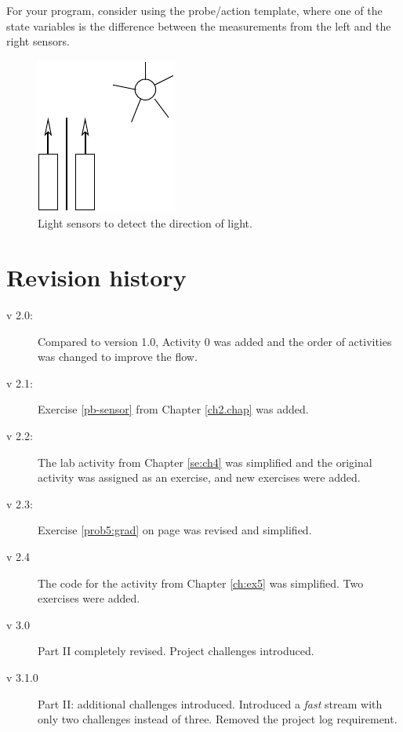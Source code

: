 \documentclass[12pt]{book}
\begin{document}
For your program, consider using the probe/action template, where one
of the state variables is the difference between the measurements from
the left and the right sensors.

\begin{figure}[tb]
  \begin{center}
	\includegraphics[width=.2\textwidth]{figs/2eyes}
  \end{center}
\caption{Light sensors to detect the direction of
  light.}	\label{fig:2eyes} 
\end{figure}



\appendix
\chapter{Revision history}

\begin{description}
\item[v 2.0:] Compared to version 1.0, Activity 0 was added and the
  order of activities was changed to improve the flow.
\item[v 2.1:] Exercise \ref{pb-sensor} from Chapter \ref{ch2.chap} was
  added.
\item[v 2.2:] The lab activity from Chapter \ref{se:ch4} was
  simplified and the original activity was assigned as an exercise,
  and new exercises were added.
\item[v 2.3:] Exercise \ref{prob5:grad} on page \pageref{prob5:grad}
  was revised and simplified.
\item[v 2.4] The code for the activity from Chapter \ref{ch:ex5} was
  simplified. Two exercises were added.
\item[v 3.0] Part II completely revised. Project challenges introduced.

\item[v 3.1.0] Part II: additional challenges introduced. Introduced a \emph{fast} stream with only two challenges instead of three. Removed the project log requirement.
  
\end{description}
 
\end{document}
